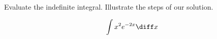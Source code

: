 Evaluate the indefinite integral. Illustrate the steps of our solution.

\[
\int x^2 e^{-2x}\diff x
\]

\solution{



}